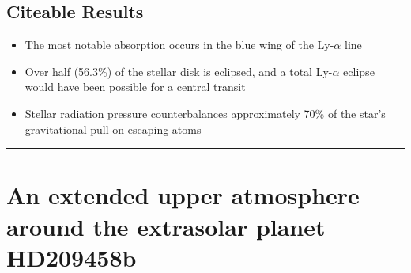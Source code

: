 \documentclass[onecolumn]{aastex63}
\begin{document}
\subsection{Citeable Results}
\begin{itemize}
    \item The most notable absorption occurs in the blue wing of the Ly-$\alpha$ line
    \item Over half (56.3\%) of the stellar disk is eclipsed, and a total Ly-$\alpha$ eclipse would have been possible for a central transit
    \item Stellar radiation pressure counterbalances approximately 70\% of the star's gravitational pull on escaping atoms
\end{itemize}





\vspace{1cm}
\hrule
\vspace{1cm}

\section{An extended upper atmosphere around the extrasolar planet HD209458b}
\begin{centering}

\cite{vidal-madjar2003}

\end{centering}
\end{document}

